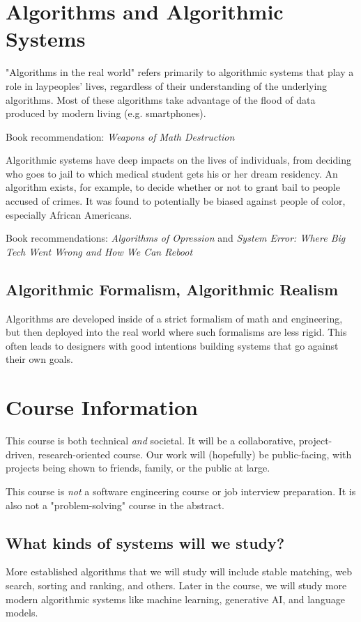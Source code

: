 \documentclass[titlepage, 12pt, leqno]{article}
\begin{document}
\pagebreak
\section{Algorithms and Algorithmic Systems}
"Algorithms in the real world" refers primarily to algorithmic systems that play
a role in laypeoples' lives, regardless of their understanding of the 
underlying algorithms. Most of these algorithms take advantage of the flood of
data produced by modern living (e.g. smartphones).

\begin{note}
    Book recommendation: \textit{Weapons of Math Destruction}
\end{note}

Algorithmic systems have deep impacts on the lives of individuals, from deciding
who goes to jail to which medical student gets his or her dream residency. An
algorithm exists, for example, to decide whether or not to grant bail to people
accused of crimes. It was found to potentially be biased against people of color,
especially African Americans.

\begin{note}
    Book recommendations: \textit{Algorithms of Opression} and \textit{System 
    Error: Where Big Tech Went Wrong and How We Can Reboot}
\end{note}

\subsection{Algorithmic Formalism, Algorithmic Realism}
Algorithms are developed inside of a strict formalism of math and engineering, but
then deployed into the real world where such formalisms are less rigid. This 
often leads to designers with good intentions building systems that go against
their own goals.

\pagebreak
\section{Course Information}

This course is both technical \textit{and} societal. It will be a collaborative,
project-driven, research-oriented course. Our work will (hopefully) be
public-facing, with projects being shown to friends, family, or the public at 
large.

This course is \textit{not} a software engineering course or job interview 
preparation. It is also not a "problem-solving" course in the abstract.

\subsection{What kinds of systems will we study?}
More established algorithms that we will study will include stable matching, web
search, sorting and ranking, and others. Later in the course, we will study more
modern algorithmic systems like machine learning, generative AI, and language
models.
\end{document}
